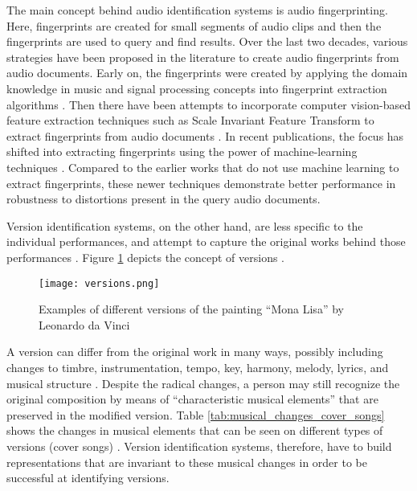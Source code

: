 \documentclass[../main.tex]{subfiles}
\begin{document}
\par
The main concept behind audio identification systems is audio fingerprinting. Here, fingerprints are created for small segments of audio clips and then the fingerprints are  used to query and find results. Over the last two decades, various strategies have been proposed in the literature to create audio fingerprints from audio documents. Early on, the fingerprints were created by applying the domain knowledge in music and signal processing concepts into fingerprint extraction algorithms  \cite{haitsmaHighlyRobustAudio2002,wangIndustrialStrengthAudio2003,ellisEchoPrintOpenSource2011,miroMASKRobustLocal2012,sixPanakoScalableAcoustic2014}. Then there have been attempts to incorporate computer vision-based feature extraction techniques such as Scale Invariant Feature Transform to extract fingerprints from audio documents \cite{computer_vision_for_music_identification,sift}. In recent publications, the focus has shifted into extracting fingerprints using the power of machine-learning techniques \cite{arcas_now_2017,baez_suarez_unsupervised_2020,yu_contrastive_2020}. Compared to the earlier works that do not use machine learning to extract fingerprints, these newer techniques demonstrate better performance in robustness to distortions present in the query audio documents. 
\\
\par
Version identification systems, on the other hand, are less specific to the individual performances, and attempt to capture the original works behind those performances \cite{serraAudioCoverSong2010}. Figure \ref{fig:versions} depicts the concept of versions \cite{book}.
\begin{figure}[H]
    \centering
    \texttt{[image: versions.png]}
    \caption{Examples of different versions of the painting “Mona Lisa” by Leonardo da Vinci}
    \label{fig:versions}
\end{figure}

\par
A version can differ from the original work in many ways, possibly including changes to timbre, instrumentation, tempo, key, harmony, melody, lyrics, and musical structure \cite{book}. Despite the radical changes, a person may still recognize the original composition by means of “characteristic musical elements” that are preserved in the modified version. Table \ref{tab:musical_changes_cover_songs} shows the changes in musical elements that can be seen on different types of versions (cover songs) \cite{serraAudioCoverSong2010}. Version identification systems, therefore, have to build representations that are invariant to these musical changes in order to be successful at identifying versions.
\end{document}
